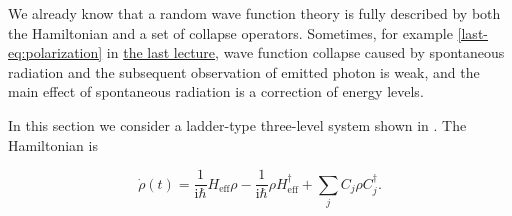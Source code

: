 \documentclass[hyperref, a4paper]{article}
\newcommand*{\ii}{\mathrm{i}}
\newcommand{\lastnote}{\href{12-2.pdf}{the last lecture}}
\begin{document}
We already know that a random wave function theory is fully described by both the Hamiltonian and a set 
of collapse operators. Sometimes, for example \eqref{last-eq:polarization} in \lastnote, wave function collapse
caused by spontaneous radiation and the subsequent observation of emitted photon is weak, and the main 
effect of spontaneous radiation is a correction of energy levels.

In this section we consider a ladder-type three-level system shown in .
The Hamiltonian is 

\begin{equation}
    \dot{\rho}(t) = \frac{1}{\ii \hbar} H_\text{eff} \rho - \frac{1}{\ii \hbar} \rho H_\text{eff}^\dagger + \sum_j C_j \rho C_j^\dagger.
\end{equation}
\end{document}
